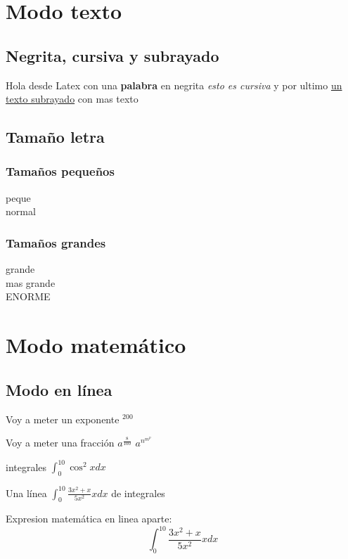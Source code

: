 \documentclass[10pt, a4paper]{report}
\begin{document}
\pagebreak
\tableofcontents
\pagebreak

\chapter{Modo texto}

\section{Negrita, cursiva y subrayado}

Hola desde Latex con
una {\bf palabra} en negrita
{\it esto es cursiva} y
por ultimo
\underline {un texto subrayado} con mas texto

\section{Tamaño letra}

\subsection{Tamaños pequeños}
{\tiny peque \\}
{\normalsize normal \\}
\subsection{Tamaños grandes}
{\large grande \\}
{\LARGE mas grande \\}
{\Huge ENORME \\}

\chapter{Modo matemático}

\section{Modo en línea}

Voy a meter un exponente $^{200} $

Voy a meter una fracción $ a^{\frac{8}{100}} $
$ a^{n^{m^{p}}} $

integrales $ \int_{0}^{10} \cos^2 x dx $

Una línea $ \int_{0}^{10} \frac{3x^2+x}{5x^2} x dx $ de integrales

Expresion matemática en linea aparte:
$$ \int_{0}^{10} \frac{3x^2+x}{5x^2} x dx $$
\end{document}
